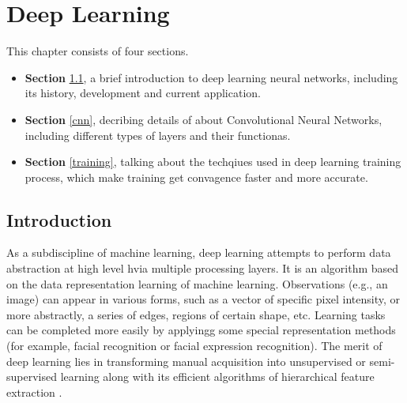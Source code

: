 \chapter{Deep Learning}
\label{cp:dp}
This chapter consists of four sections. 
\begin{itemize}
    \item \textbf{Section} \ref{dpintro}, a brief introduction to deep learning neural networks, including its history, development and current application.
    \item \textbf{Section} \ref{cnn}, decribing details of about Convolutional Neural Networks, including different types of layers and their functionas.
    \item \textbf{Section} \ref{training}, talking about the techqiues used in deep learning training process, which make training get convagence faster and more accurate.  
\end{itemize} 

\section{Introduction}
    \label{dpintro}
    As a subdiscipline of machine learning, deep learning attempts to perform data abstraction at high level hvia multiple processing layers. It is an algorithm based on the data representation learning of machine learning. Observations (e.g., an image) can appear in various forms, such as a vector of specific pixel intensity, or more abstractly, a series of edges, regions of certain shape, etc. Learning tasks can be completed more easily by applyingg some special representation methods (for example, facial recognition or facial expression recognition). The merit of deep learning lies in transforming manual acquisition into unsupervised or semi-supervised learning along with its efficient algorithms of hierarchical feature extraction \cite{schmidhuber2015deep}.

